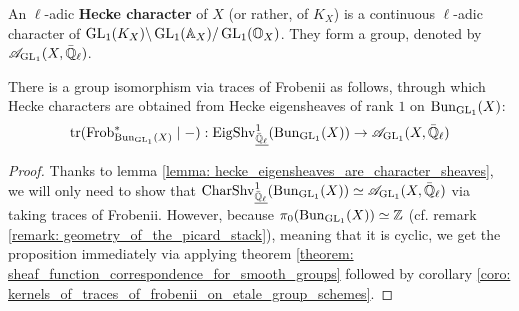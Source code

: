             \begin{definition} \label{def: hecke_characters}
                An $\ell$-adic \textbf{Hecke character} of $X$ (or rather, of $K_X$) is a continuous $\ell$-adic character of $\operatorname{GL}_1(K_X)\backslash\operatorname{GL}_1(\mathbb{A}_X)/\operatorname{GL}_1(\mathbb{O}_{X})$. They form a group, denoted by $\mathscr{A}_{\operatorname{GL}_1}(X, \bar{\mathbb{Q}}_{\ell})$.
            \end{definition}
            \begin{proposition} \label{prop: hecke_characters_from_hecke_eigensheaves}
                There is a group isomorphism via traces of Frobenii as follows, through which Hecke characters are obtained from Hecke eigensheaves of rank $1$ on $\mathrm{Bun}_{\operatorname{GL}_1}(X)$:
                    $$\operatorname{tr}(\mathrm{Frob}_{\mathrm{Bun}_{\operatorname{GL}_1}(X)}^* \mid -): \mathrm{Eig}\mathrm{Shv}_{\underline{\bar{\mathbb{Q}}_{\ell}}}^1(\mathrm{Bun}_{\operatorname{GL}_1}(X)) \to \mathscr{A}_{\operatorname{GL}_1}(X, \bar{\mathbb{Q}}_{\ell})$$
            \end{proposition}
                \begin{proof}
                    Thanks to lemma \ref{lemma: hecke_eigensheaves_are_character_sheaves}, we will only need to show that $\mathrm{Char}\mathrm{Shv}_{\underline{\bar{\mathbb{Q}}_{\ell}}}^1(\mathrm{Bun}_{\operatorname{GL}_1}(X)) \simeq \mathscr{A}_{\operatorname{GL}_1}(X, \bar{\mathbb{Q}}_{\ell})$ via taking traces of Frobenii. However, because $\pi_0(\mathrm{Bun}_{\operatorname{GL}_1}(X)) \simeq \mathbb{Z}$ (cf. remark \ref{remark: geometry_of_the_picard_stack}), meaning that it is cyclic, we get the proposition immediately via applying theorem \ref{theorem: sheaf_function_correspondence_for_smooth_groups} followed by corollary \ref{coro: kernels_of_traces_of_frobenii_on_etale_group_schemes}.
                \end{proof}
                

